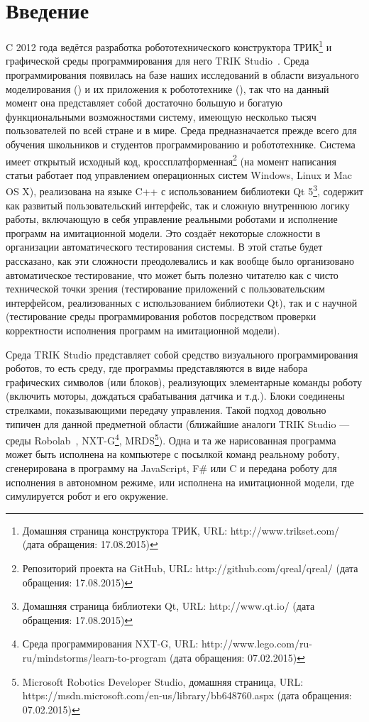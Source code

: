\documentclass[conference]{IEEEtran}
\begin{document}
\section{Введение}
C 2012 года ведётся разработка робототехнического конструктора ТРИК\footnote{Домашняя страница конструктора ТРИК, URL: http://www.trikset.com/ (дата обращения: 17.08.2015)} 
и графической среды программирования для него TRIK Studio~\cite{litvinov2015trikstudio}. Среда программирования 
появилась на базе наших исследований в области визуального моделирования (\cite{kuzenkova2013qreal, kuzenkova2011qreal, terekhov2009architecture}) 
и их приложения к робототехнике (\cite{terekhov2013robots, litvinov2012robots, tikhonova2012robots, bryksin2011robots}), 
так что на данный момент она представляет собой достаточно большую и богатую функциональными возможностями 
систему, имеющую несколько тысяч пользователей по всей стране и в мире. Среда предназначается прежде всего 
для обучения школьников и студентов программированию и робототехнике. Система имеет открытый исходный 
код, кроссплатформенная\footnote{Репозиторий проекта на GitHub, URL: http://github.com/qreal/qreal/ (дата обращения: 17.08.2015)} 
(на момент написания статьи работает под управлением операционных систем Windows, Linux и Mac OS X), реализована 
на языке C++ с использованием библиотеки Qt 5\footnote{Домашняя страница библиотеки Qt, URL: http://www.qt.io/ (дата обращения: 17.08.2015)}, 
содержит как развитый пользовательский интерфейс, так и сложную внутреннюю логику работы, включающую в 
себя управление реальными роботами и исполнение программ на имитационной модели. Это создаёт некоторые 
сложности в организации автоматического тестирования системы. В этой статье будет рассказано, как эти 
сложности преодолевались и как вообще было организовано автоматическое тестирование, что может быть полезно 
читателю как с чисто технической точки зрения (тестирование приложений с пользовательским интерфейсом, 
реализованных с использованием библиотеки Qt), так и с научной (тестирование среды программирования роботов 
посредством проверки корректности исполнения программ на имитационной модели).

Среда TRIK Studio представляет собой средство визуального программирования роботов, то есть среду, где 
программы представляются в виде набора графических символов (или блоков), реализующих элементарные команды 
роботу (включить моторы, дождаться срабатывания датчика и т.д.). Блоки соединены стрелками, показывающими 
передачу управления. Такой подход довольно типичен для данной предметной области (ближайшие аналоги TRIK Studio 
--- среды Robolab~\cite{portsmore1999robolab}, NXT-G\footnote{Среда программирования NXT-G, URL: http://www.lego.com/ru-ru/mindstorms/learn-to-program (дата обращения: 07.02.2015)}, 
MRDS\footnote{Microsoft Robotics Developer Studio, домашняя страница, URL: https://msdn.microsoft.com/en-us/library/bb648760.aspx (дата обращения: 07.02.2015)}). 
Одна и та же нарисованная программа может быть исполнена на компьютере с посылкой команд реальному роботу, сгенерирована в программу 
на JavaScript, F\# или C и передана роботу для исполнения в автономном режиме, или исполнена на имитационной 
модели, где симулируется робот и его окружение.
\end{document}
